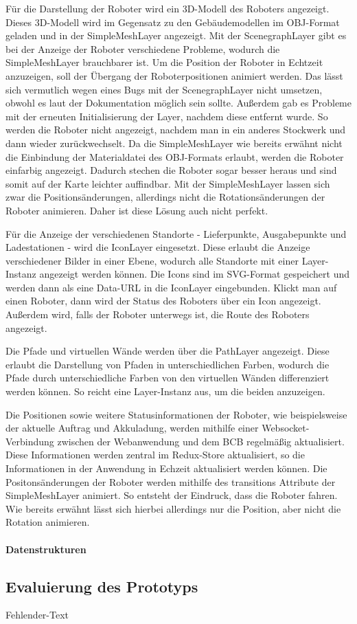 Für die Darstellung der Roboter wird ein 3D-Modell des Roboters angezeigt. Dieses 3D-Modell wird im Gegensatz zu den Gebäudemodellen im \ac{OBJ}-Format geladen und in der SimpleMeshLayer angezeigt. Mit der ScenegraphLayer gibt es bei der Anzeige der Roboter verschiedene Probleme, wodurch die SimpleMeshLayer brauchbarer ist. Um die Position der Roboter in Echtzeit anzuzeigen, soll der Übergang der Roboterpositionen animiert werden. Das lässt sich vermutlich wegen eines Bugs mit der ScenegraphLayer nicht umsetzen, obwohl es laut der Dokumentation möglich sein sollte. Außerdem gab es Probleme mit der erneuten Initialisierung der Layer, nachdem diese entfernt wurde. So werden die Roboter nicht angezeigt, nachdem man in ein anderes Stockwerk und dann wieder zurückwechselt. Da die SimpleMeshLayer wie bereits erwähnt nicht die Einbindung der Materialdatei des \ac{OBJ}-Formats erlaubt, werden die Roboter einfarbig angezeigt. Dadurch stechen die Roboter sogar besser heraus und sind somit auf der Karte leichter auffindbar. Mit der SimpleMeshLayer lassen sich zwar die Positionsänderungen, allerdings nicht die Rotationsänderungen der Roboter animieren. Daher ist diese Lösung auch nicht perfekt.

Für die Anzeige der verschiedenen Standorte - Lieferpunkte, Ausgabepunkte und Ladestationen - wird die IconLayer eingesetzt. Diese erlaubt die Anzeige verschiedener Bilder in einer Ebene, wodurch alle Standorte mit einer Layer-Instanz angezeigt werden können. 
Die Icons sind im \ac{SVG}-Format gespeichert und werden dann als eine Data-URL in die IconLayer eingebunden.
Klickt man auf einen Roboter, dann wird der Status des Roboters über ein Icon angezeigt. Außerdem wird, falls der Roboter unterwegs ist, die Route des Roboters angezeigt. 

Die Pfade und virtuellen Wände werden über die PathLayer angezeigt. Diese erlaubt die Darstellung von Pfaden in unterschiedlichen Farben, wodurch die Pfade durch unterschiedliche Farben von den virtuellen Wänden differenziert werden können.
So reicht eine Layer-Instanz aus, um die beiden anzuzeigen.

Die Positionen sowie weitere Statusinformationen der Roboter, wie beispielsweise der aktuelle Auftrag und Akkuladung, werden mithilfe einer \gls{Websocket}-Verbindung zwischen der Webanwendung und dem \ac{BCB} regelmäßig aktualisiert. Diese Informationen werden zentral im Redux-Store aktualisiert, so die Informationen in der Anwendung in Echzeit aktualisiert werden können. Die Positonsänderungen der Roboter werden mithilfe des transitions Attribute der SimpleMeshLayer animiert. So entsteht der Eindruck, dass die Roboter fahren. Wie bereits erwähnt lässt sich hierbei allerdings nur die Position, aber nicht die Rotation animieren. 

\paragraph{Datenstrukturen}

\newpage
\subsection{Evaluierung des Prototyps}
Fehlender-Text
